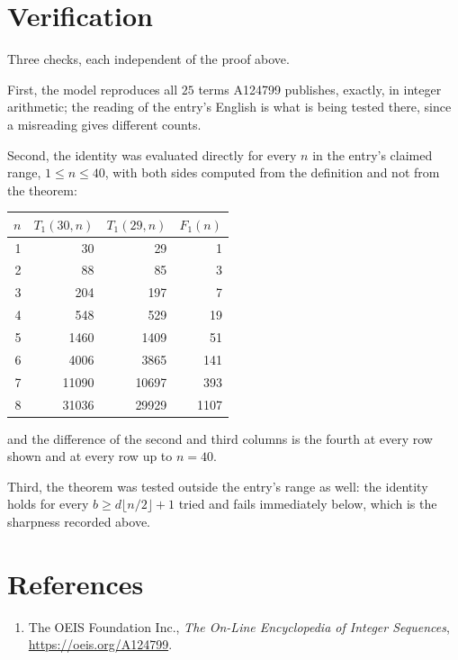 \documentclass[11pt,a4paper]{article}
\theoremstyle{plain}
\theoremstyle{definition}
\begin{document}
\section{Verification}

Three checks, each independent of the proof above.

First, the model reproduces all $25$ terms A124799 publishes, exactly, in integer
arithmetic; the reading of the entry's English is what is being tested there, since a
misreading gives different counts.

Second, the identity was evaluated directly for every $n$ in the entry's claimed range,
$1\le n\le40$, with both sides computed from the definition and not from the theorem:

\begin{center}
\begin{tabular}{rrrr}
$n$ & $T_{1}(30,n)$ & $T_{1}(29,n)$ & $F_{1}(n)$ \\ \hline
1 & 30 & 29 & 1 \\
2 & 88 & 85 & 3 \\
3 & 204 & 197 & 7 \\
4 & 548 & 529 & 19 \\
5 & 1460 & 1409 & 51 \\
6 & 4006 & 3865 & 141 \\
7 & 11090 & 10697 & 393 \\
8 & 31036 & 29929 & 1107 \\
\end{tabular}
\end{center}

\noindent and the difference of the second and third columns is the fourth at every row shown
and at every row up to $n=40$.

Third, the theorem was tested outside the entry's range as well: the identity holds for every
$b\ge d\lfloor n/2\rfloor+1$ tried and fails immediately below, which is the sharpness recorded
above.

\section*{References}
\begin{enumerate}
\item The OEIS Foundation Inc., \emph{The On-Line Encyclopedia of Integer Sequences},
\url{https://oeis.org/A124799}.
\end{enumerate}
\end{document}
